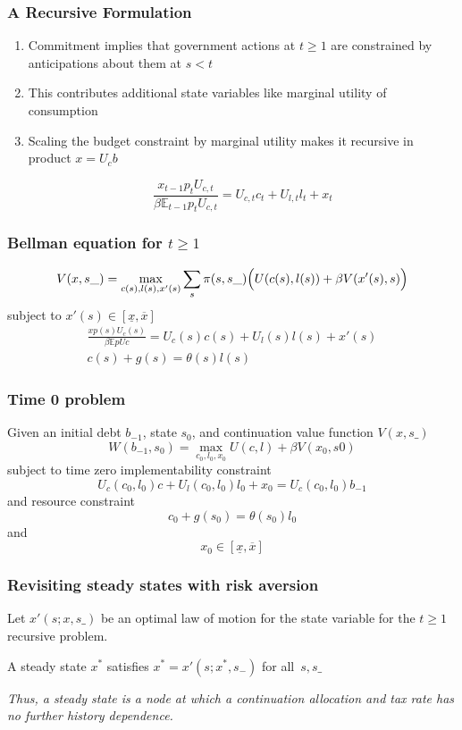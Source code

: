 \documentclass{beamer}
\newcommand{\EE}{\mathbb E}
\begin{document}
 \begin{frame}
	\frametitle{A Recursive Formulation}
	
	\begin{enumerate}
	 \item Commitment implies that government actions at $t \geq 1$ are constrained by  anticipations about them at $s < t$
	 \item This contributes additional state variables like marginal utility of consumption
	 \item Scaling the budget constraint by marginal utility makes it recursive in product $x=U_c b$
	
	\[
		\frac{x_{t-1} p_t U_{c,t}}{\beta \EE_{t-1} p_t U_{c,t}}  = U_{c,t}c_t+U_{l,t} l_t + x_t
	\]
	
	\end{enumerate}
	
	
	\end{frame}
	\begin{frame}
	\frametitle{Bellman equation for $t\geq1$}
	\[
		V(x,s\_) = \max_{c(s),l(s),x'(s)} \sum_s \pi(s,s\_)\Bigl(U(c(s),l(s)) + \beta V(x'(s),s)\Bigr)
	\]subject to $x'(s)\in [\underline x,\overline x]$
	\begin{align*}
		\frac{x p(s) U_c(s)}{\beta\EE pUc} =U_c(s)c(s)+U_l(s)l(s) + x'(s)\\
		c(s) + g(s) = \theta(s)l(s)
	\end{align*}
	
 \end{frame}
\begin{frame}
	\frametitle{Time 0 problem}
	Given an initial  debt $b_{-1}$, state $s_0$,  and continuation value function $V(x,s\_)$
	\[
		W(b_{-1},s_0) = \max_{c_{0},l_0,x_{0}} U(c,l) +\beta V(x_0,s0)
	\]subject to  time zero implementability constraint
	\[
		U_{c}(c_0,l_0)c + U_l(c_0,l_0) l_0 + x_0 = U_c(c_0,l_0) b_{-1}
	\]and  resource constraint
	\[
		c_0+ g(s_0) = \theta(s_0) l_0
	\]and
	\[
		x_0 \in [\underline x,\overline x]
	\]
\end{frame}



\begin{frame}
 \frametitle{Revisiting steady states with risk aversion}
Let $x'\left( s;{x},s\_\right) $ be an optimal  law of motion for the state variable
for the $t\geq1$ recursive problem.

\begin{definition}
 A steady state  ${x}^{*} $  satisfies ${ x}^{*}  =x' \left( s;{x}^{*},s_{-}\right) $ for all $%
\,s,s\_$
\end{definition}


\vspace{3mm}
\emph{Thus, a steady state is a node at which a continuation allocation and tax rate has no further history dependence. }

 \end{frame}
\end{document}
